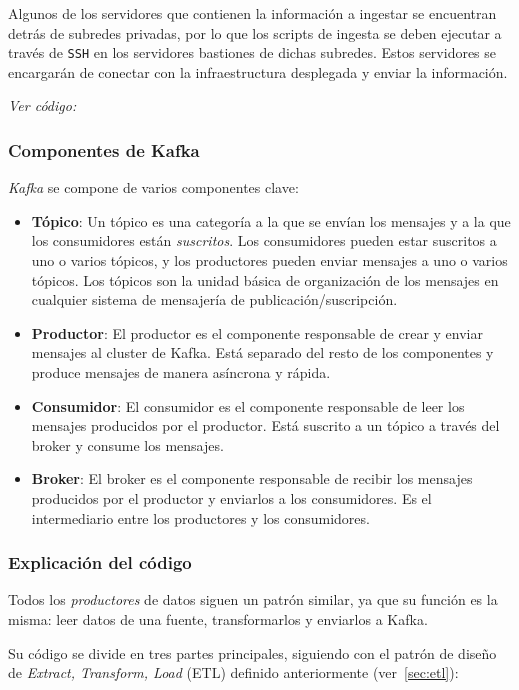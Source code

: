 Algunos de los servidores que contienen la información a ingestar se encuentran
detrás de subredes privadas, por lo que los scripts de ingesta se deben ejecutar
a través de \texttt{SSH} en los servidores bastiones de dichas subredes. Estos
servidores se encargarán de conectar con la infraestructura desplegada y enviar
la información.

\textit{Ver código: }


\subsubsection{Componentes de Kafka}
\textit{Kafka} se compone de varios componentes clave:

\begin{itemize}
    \item \textbf{Tópico}: Un tópico es una categoría a la que se envían los
		mensajes y a la que los consumidores están \textit{suscritos}. Los
		consumidores pueden estar suscritos a uno o varios tópicos, y los
		productores pueden enviar mensajes a uno o varios tópicos. Los tópicos
		son la unidad básica de organización de los mensajes en cualquier
		sistema de mensajería de publicación/suscripción.
    \item \textbf{Productor}: El productor es el componente responsable de crear
		y enviar mensajes al cluster de Kafka. Está separado del resto de los
		componentes y produce mensajes de manera asíncrona y rápida.
    \item \textbf{Consumidor}: El consumidor es el componente responsable de
		leer los mensajes producidos por el productor. Está suscrito a un tópico
		a través del broker y consume los mensajes.
    \item \textbf{Broker}: El broker es el componente responsable de recibir los
		mensajes producidos por el productor y enviarlos a los consumidores. Es
		el intermediario entre los productores y los consumidores.
\end{itemize}


\newpage{}
\subsubsection{Explicación del código}
Todos los \textit{productores} de datos siguen un patrón similar, ya que su
función es la misma: leer datos de una fuente, transformarlos y enviarlos a
Kafka.

Su código se divide en tres partes principales, siguiendo con el patrón de
diseño de \textit{Extract, Transform, Load} (ETL) definido anteriormente
(ver~\ref{sec:etl}):

